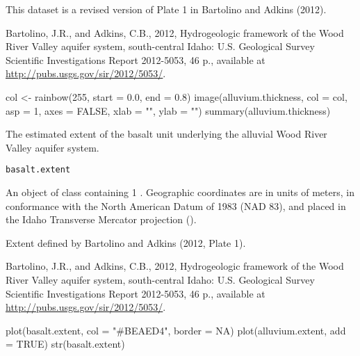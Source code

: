 \documentclass[a4paper]{book}
\begin{document}
%
\begin{Source}\relax
This dataset is a revised version of Plate 1 in Bartolino and Adkins (2012).
\end{Source}
%
\begin{References}\relax
Bartolino, J.R., and Adkins, C.B., 2012, Hydrogeologic framework of the Wood River Valley aquifer system, south-central Idaho: U.S. Geological Survey Scientific Investigations Report 2012-5053, 46 p., available at \url{http://pubs.usgs.gov/sir/2012/5053/}.
\end{References}
%
\begin{Examples}
\begin{ExampleCode}
col <- rainbow(255, start = 0.0, end = 0.8)
image(alluvium.thickness, col = col, asp = 1, axes = FALSE, xlab = "", ylab = "")
summary(alluvium.thickness)
\end{ExampleCode}
\end{Examples}
%
\begin{Description}\relax
The estimated extent of the basalt unit underlying the alluvial Wood River Valley aquifer system.
\end{Description}
%
\begin{Usage}
\begin{verbatim}
basalt.extent
\end{verbatim}
\end{Usage}
%
\begin{Format}
An object of  class containing 1 .
Geographic coordinates are in units of meters, in conformance with the North American Datum of 1983 (NAD 83), and placed in the
Idaho Transverse Mercator projection ().
\end{Format}
%
\begin{Source}\relax
Extent defined by Bartolino and Adkins (2012, Plate 1).
\end{Source}
%
\begin{References}\relax
Bartolino, J.R., and Adkins, C.B., 2012, Hydrogeologic framework of the Wood River Valley aquifer system, south-central Idaho: U.S. Geological Survey Scientific Investigations Report 2012-5053, 46 p., available at \url{http://pubs.usgs.gov/sir/2012/5053/}.
\end{References}
%
\begin{Examples}
\begin{ExampleCode}
plot(basalt.extent, col = "#BEAED4", border = NA)
plot(alluvium.extent, add = TRUE)
str(basalt.extent)
\end{ExampleCode}
\end{Examples}
\end{document}
